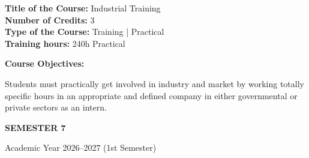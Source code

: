 \documentclass[12pt,a4paper]{article}
\begin{document}
\newpage
\nopagebreak
\textbf{Title of the Course:} Industrial Training\\
\textbf{Number of Credits:} 3\\
\textbf{Type of the Course:} Training | Practical\\
\textbf{Training hours:} 240h Practical\par\vspace{4pt}
\textbf{Course Objectives:}\par\vspace{2pt}
Students must practically get involved in industry and market by working totally specific hours in
an appropriate and defined company in either governmental or private sectors as an intern.\par\vspace{4pt}

\newpage
\vspace*{\fill}
\begin{center}
  {\fontsize{28pt}{34pt}\selectfont \textbf{SEMESTER 7}}\par\vspace{12pt}
  {\fontsize{13pt}{17pt}\selectfont Academic Year 2026–2027 (1st Semester)}
\end{center}
\vspace*{\fill}
\end{document}
